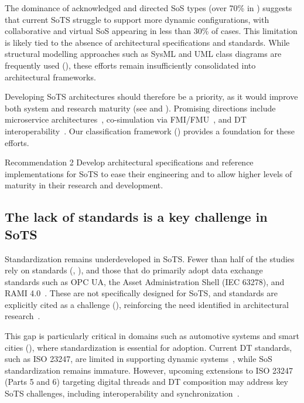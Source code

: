 The dominance of acknowledged and directed SoS types (over 70\% in ) suggests that current SoTS struggle to support more dynamic configurations, with collaborative and virtual SoS appearing in less than 30\% of cases. This limitation is likely tied to the absence of architectural specifications and standards. While structural modelling approaches such as SysML and UML class diagrams are frequently used (), these efforts remain insufficiently consolidated into architectural frameworks.

Developing SoTS architectures should therefore be a priority, as it would improve both system and research maturity (see  and ). Promising directions include microservice architectures~\cite{bellavista2023requirements}, co-simulation via FMI/FMU~\cite{bottjer2023review}, and DT interoperability~\cite{david2024interoperability}. Our classification framework () provides a foundation for these efforts.

\begin{recoframe}{Recommendation 2}
Develop architectural specifications and reference implementations for SoTS to ease their engineering and to allow higher levels of maturity in their research and development.
\end{recoframe}


\subsection{The lack of standards is a key challenge in SoTS}

Standardization remains underdeveloped in SoTS. Fewer than half of the studies rely on standards (, ), and those that do primarily adopt data exchange standards such as OPC UA, the Asset Administration Shell (IEC 63278), and RAMI 4.0~\cite{shao2024manufacturing}. These are not specifically designed for SoTS, and standards are explicitly cited as a challenge (), reinforcing the need identified in architectural research~\cite{ferko2022architecting}.

This gap is particularly critical in domains such as automotive systems and smart cities (), where standardization is essential for adoption. Current DT standards, such as ISO 23247, are limited in supporting dynamic systems~\cite{liu2024ai}, while SoS standardization remains immature. However, upcoming extensions to ISO 23247 (Parts 5 and 6) targeting digital threads and DT composition may address key SoTS challenges, including interoperability and synchronization~\cite{shao2024manufacturing}.

